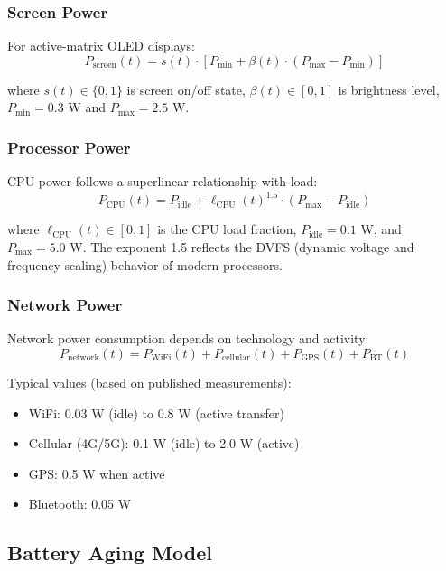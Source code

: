 \documentclass[12pt]{article}
\begin{document}
\subsubsection{Screen Power}
For active-matrix OLED displays:
\begin{equation}
P_{\text{screen}}(t) = s(t) \cdot \left[P_{\min} + \beta(t) \cdot (P_{\max} - P_{\min})\right]
\label{eq:pscreen}
\end{equation}

where $s(t) \in \{0, 1\}$ is screen on/off state, $\beta(t) \in [0, 1]$ is brightness level, $P_{\min} = 0.3$ W and $P_{\max} = 2.5$ W.

\subsubsection{Processor Power}
CPU power follows a superlinear relationship with load:
\begin{equation}
P_{\text{CPU}}(t) = P_{\text{idle}} + \ell_{\text{CPU}}(t)^{1.5} \cdot (P_{\text{max}} - P_{\text{idle}})
\label{eq:pcpu}
\end{equation}

where $\ell_{\text{CPU}}(t) \in [0, 1]$ is the CPU load fraction, $P_{\text{idle}} = 0.1$ W, and $P_{\text{max}} = 5.0$ W. The exponent 1.5 reflects the DVFS (dynamic voltage and frequency scaling) behavior of modern processors.

\subsubsection{Network Power}
Network power consumption depends on technology and activity:
\begin{equation}
P_{\text{network}}(t) = P_{\text{WiFi}}(t) + P_{\text{cellular}}(t) + P_{\text{GPS}}(t) + P_{\text{BT}}(t)
\label{eq:pnetwork}
\end{equation}

Typical values (based on published measurements):
\begin{itemize}
    \item WiFi: 0.03 W (idle) to 0.8 W (active transfer)
    \item Cellular (4G/5G): 0.1 W (idle) to 2.0 W (active)
    \item GPS: 0.5 W when active
    \item Bluetooth: 0.05 W
\end{itemize}

\subsection{Battery Aging Model}
\end{document}
